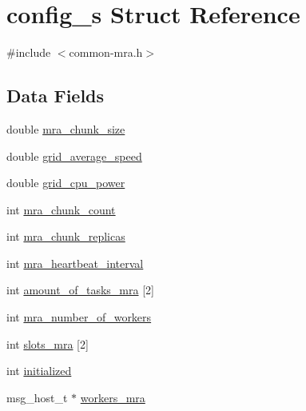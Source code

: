 \hypertarget{structconfig__s}{\section{config\-\_\-s \-Struct \-Reference}
\label{structconfig__s}
}


{\ttfamily \#include $<$common-\/mra.\-h$>$}

\subsection*{\-Data \-Fields}
\begin{DoxyCompactItemize}
\item 
double \hyperlink{structconfig__s_a33bd48451a5304468d1a438573193d92}{mra\-\_\-chunk\-\_\-size}
\item 
double \hyperlink{structconfig__s_a6bc024fc05bd7ee560aa58399e4ed39b}{grid\-\_\-average\-\_\-speed}
\item 
double \hyperlink{structconfig__s_a907f6cdbc6d12af5e2eaacc353c88873}{grid\-\_\-cpu\-\_\-power}
\item 
int \hyperlink{structconfig__s_ac38b035ee453f7d1c10d3f7632d2b01f}{mra\-\_\-chunk\-\_\-count}
\item 
int \hyperlink{structconfig__s_a0b7717717cfcdb2a44683a0c88fbd4a2}{mra\-\_\-chunk\-\_\-replicas}
\item 
int \hyperlink{structconfig__s_a705e55f5c2e8ea0d55c129a81c06654e}{mra\-\_\-heartbeat\-\_\-interval}
\item 
int \hyperlink{structconfig__s_a102493327d4f5a14ddd3c5d42dd36b74}{amount\-\_\-of\-\_\-tasks\-\_\-mra} \mbox{[}2\mbox{]}
\item 
int \hyperlink{structconfig__s_a3a5b8a103b3cb1934cfb1aa58a1e4d86}{mra\-\_\-number\-\_\-of\-\_\-workers}
\item 
int \hyperlink{structconfig__s_af8edcffd357e2d4087165a18b2c3e767}{slots\-\_\-mra} \mbox{[}2\mbox{]}
\item 
int \hyperlink{structconfig__s_a0c33578ad98e034d6ef2fa0563f64a10}{initialized}
\item 
msg\-\_\-host\-\_\-t $\ast$ \hyperlink{structconfig__s_a25044c7b99a27e3823ec661de25d38d5}{workers\-\_\-mra}
\end{DoxyCompactItemize}


